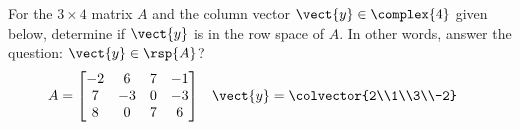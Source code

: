 For the $3\times 4$ matrix $A$ and the column vector $\vect{y}\in\complex{4}$ given below, determine if $\vect{y}$ is in the row space of $A$. In other words, answer the question:  $\vect{y}\in\rsp{A}$?
%
\begin{align*}
A&=
\begin{bmatrix}
 -2 & 6 & 7 & -1 \\
 7 & -3 & 0 & -3 \\
 8 & 0 & 7 & 6
\end{bmatrix}
&
\vect{y}&=
\colvector{2\\1\\3\\-2}
\end{align*}